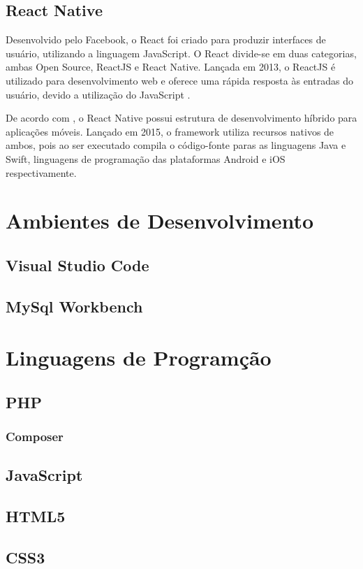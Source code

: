 	\subsection{React Native}
	
		Desenvolvido pelo Facebook, o React foi criado para produzir interfaces de usuário, utilizando a linguagem JavaScript. O React divide-se em duas categorias, ambas Open Source, ReactJS e React Native. Lançada em 2013, o ReactJS é utilizado para desenvolvimento web e oferece uma rápida resposta às entradas do usuário, devido a utilização do JavaScript \cite{vilete2018frameworks}.
		
		De acordo com , o React Native possui estrutura de desenvolvimento híbrido para aplicações móveis. Lançado em 2015, o framework utiliza recursos nativos de ambos, pois ao ser executado compila o código-fonte paras as linguagens Java e Swift, linguagens de programação das plataformas Android e iOS respectivamente.
	
\section{Ambientes de Desenvolvimento}
	
	\subsection{Visual Studio Code}
	
	\subsection{MySql Workbench}
	
\section{Linguagens de Programção}	
	
	
	\subsection{PHP}
		
		\subsubsection{Composer}
				
	\subsection{JavaScript}
		
	\subsection{HTML5}
		
	\subsection{CSS3}
		
	
 









